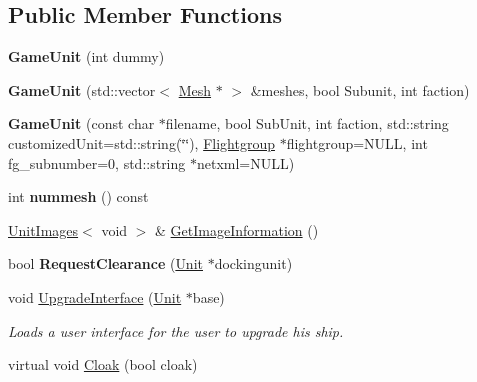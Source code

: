 \subsection*{Public Member Functions}
\begin{DoxyCompactItemize}
\item 
{\bfseries Game\+Unit} (int dummy)\hypertarget{classGameUnit_a1ddc1efd7c3eba118c7868034c899728}{}\label{classGameUnit_a1ddc1efd7c3eba118c7868034c899728}

\item 
{\bfseries Game\+Unit} (std\+::vector$<$ \hyperlink{classMesh}{Mesh} $\ast$ $>$ \&meshes, bool Subunit, int faction)\hypertarget{classGameUnit_a58fc738959d3f4e71e59c25067270b2e}{}\label{classGameUnit_a58fc738959d3f4e71e59c25067270b2e}

\item 
{\bfseries Game\+Unit} (const char $\ast$filename, bool Sub\+Unit, int faction, std\+::string customized\+Unit=std\+::string(\char`\"{}\char`\"{}), \hyperlink{classFlightgroup}{Flightgroup} $\ast$flightgroup=N\+U\+LL, int fg\+\_\+subnumber=0, std\+::string $\ast$netxml=N\+U\+LL)\hypertarget{classGameUnit_a2aa84f611c884a6f1ac87e4a061f4925}{}\label{classGameUnit_a2aa84f611c884a6f1ac87e4a061f4925}

\item 
int {\bfseries nummesh} () const \hypertarget{classGameUnit_a67751db2fb9132df43051ff4c87c78f8}{}\label{classGameUnit_a67751db2fb9132df43051ff4c87c78f8}

\item 
\hyperlink{structUnitImages}{Unit\+Images}$<$ void $>$ \& \hyperlink{classGameUnit_a679b72aede6566ee76857ef32996c6dd}{Get\+Image\+Information} ()
\item 
bool {\bfseries Request\+Clearance} (\hyperlink{classUnit}{Unit} $\ast$dockingunit)\hypertarget{classGameUnit_a2ff601b8abe0e6bc009a92a6f2af35e5}{}\label{classGameUnit_a2ff601b8abe0e6bc009a92a6f2af35e5}

\item 
void \hyperlink{classGameUnit_adfdc7375e26693445e6f99212b9e1ffd}{Upgrade\+Interface} (\hyperlink{classUnit}{Unit} $\ast$base)\hypertarget{classGameUnit_adfdc7375e26693445e6f99212b9e1ffd}{}\label{classGameUnit_adfdc7375e26693445e6f99212b9e1ffd}

\begin{DoxyCompactList}\small\item\em Loads a user interface for the user to upgrade his ship. \end{DoxyCompactList}\item 
virtual void \hyperlink{classGameUnit_a0bb5b3a42edc611db6f059886ad56445}{Cloak} (bool cloak)\hypertarget{classGameUnit_a0bb5b3a42edc611db6f059886ad56445}{}\label{classGameUnit_a0bb5b3a42edc611db6f059886ad56445}


\end{DoxyCompactItemize}
